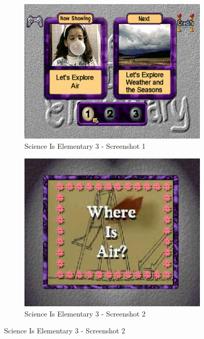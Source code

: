\begin{figure}[H]
    \centering
    \begin{subfigure}{0.45\textwidth}
        \centering
        \includegraphics[width=\linewidth]{Games/ScienceIsElementary/Images/ScienceIsElementary3Image1.png}
        \caption{Science Is Elementary 3 - Screenshot 1}
    \end{subfigure}
    \begin{subfigure}{0.45\textwidth}
        \centering
        \includegraphics[width=\linewidth]{Games/ScienceIsElementary/Images/ScienceIsElementary3Image2.png}
        \caption{Science Is Elementary 3 - Screenshot 2}
    \end{subfigure}


\end{figure}
